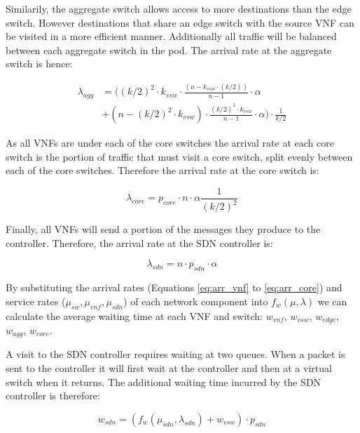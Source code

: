 Similarily, the aggregate switch allows access to more destinations than the edge switch. However destinations that share an edge switch with the source VNF can be visited in a more efficient manner. Additionally all traffic will be balanced between each aggregate switch in the pod. The arrival rate at the aggregate switch is hence:

\begin{equation}
\label{eq:arr_agg}
\begin{split}
\lambda_{agg} &= \Big((k/2)^2 \cdot k_{vsw} \cdot \frac{(n - k_{vsw} \cdot (k/2))}{n - 1} \cdot \alpha\\
			  &+ (n - (k/2)^2 \cdot k_{vsw}) \cdot \frac{(k/2)^2 \cdot k_{vsw}}{n - 1} \cdot \alpha\Big) \cdot \frac{1}{k/2}
\end{split}
\end{equation}

As all VNFs are under each of the core switches the arrival rate at each core switch is the portion of traffic that must visit a core switch, split evenly between each of the core switches. Therefore the arrival rate at the core switch is:

\begin{equation}
\label{eq:arr_core}
\lambda_{core} = p_{core} \cdot n \cdot \alpha \frac{1}{(k / 2)^2}
\end{equation}

Finally, all VNFs will send a portion of the messages they produce to the controller. Therefore, the arrival rate at the SDN controller is:

\begin{equation}
\label{eq:arr_sdn}
\lambda_{sdn} = n \cdot p_{sdn} \cdot \alpha
\end{equation}

By substituting the arrival rates (Equations \ref{eq:arr_vnf} to \ref{eq:arr_core}) and service rates ($\mu_{sw}, \mu_{vnf}, \mu_{sdn}$) of each network component into $f_w(\mu, \lambda)$ we can calculate the average waiting time at each VNF and switch: $w_{vnf}$, $w_{vsw}$, $w_{edge}$, $w_{agg}$, $w_{core}$.

A visit to the SDN controller requires waiting at two queues. When a packet is sent to the controller it will first wait at the controller and then at a virtual switch when it returns. The additional waiting time incurred by the SDN controller is therefore:

\begin{equation}
\label{eq:wait_sdn}
w_{sdn} = (f_w(\mu_{sdn}, \lambda_{sdn}) + w_{vsw}) \cdot p_{sdn}
\end{equation}

